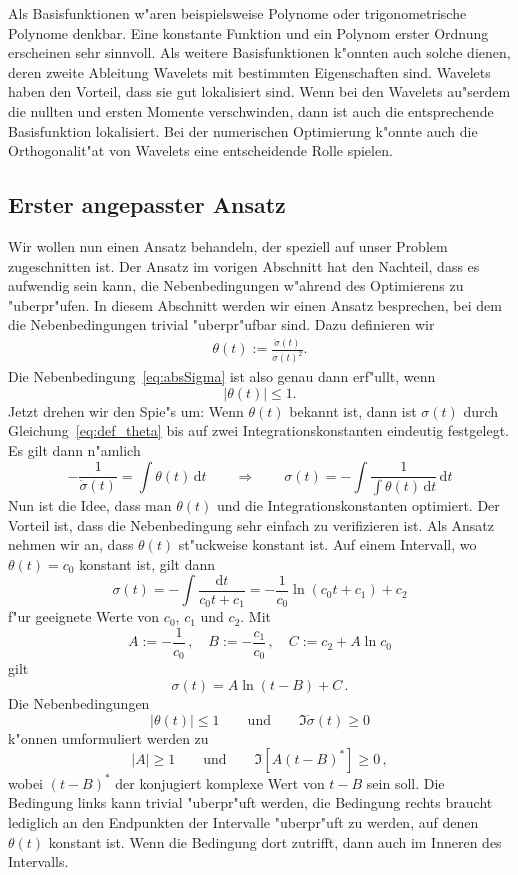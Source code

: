 \documentclass[a4paper]{scrartcl}
\newcommand{\de}{{\mathrm{d}}}
\begin{document}
Als Basisfunktionen w"aren beispielsweise Polynome oder trigonometrische Polynome denkbar. 
Eine konstante Funktion und ein Polynom erster Ordnung erscheinen sehr sinnvoll. 
Als weitere Basisfunktionen k"onnten auch solche dienen, deren zweite Ableitung Wavelets mit bestimmten Eigenschaften sind. 
Wavelets haben den Vorteil, dass sie gut lokalisiert sind. 
Wenn bei den Wavelets au"serdem die nullten und ersten Momente verschwinden, dann ist auch die entsprechende Basisfunktion lokalisiert. 
Bei der numerischen Optimierung k"onnte auch die Orthogonalit"at von Wavelets eine entscheidende Rolle spielen. 


\subsection{Erster angepasster Ansatz}

Wir wollen nun einen Ansatz behandeln, der speziell auf unser Problem zugeschnitten ist. 
Der Ansatz im vorigen Abschnitt hat den Nachteil, dass es aufwendig sein kann, die Nebenbedingungen w"ahrend des Optimierens zu "uberpr"ufen. 
In diesem Abschnitt werden wir einen Ansatz besprechen, bei dem die Nebenbedingungen trivial "uberpr"ufbar sind. 
Dazu definieren wir
\begin{align} \label{eq:def_theta} 
\theta(t) := \frac{\ddot\sigma(t)}{\dot\sigma(t)^2}. 
\end{align}
Die Nebenbedingung~\eqref{eq:absSigma} ist also genau dann erf"ullt, wenn 
$$ |\theta(t)| \le 1. $$
Jetzt drehen wir den Spie"s um: Wenn $\theta(t)$ bekannt ist, dann ist $\sigma(t)$ durch Gleichung~\eqref{eq:def_theta} bis auf zwei Integrationskonstanten eindeutig festgelegt. 
Es gilt dann n"amlich 
$$ -\frac{1}{\dot\sigma(t)} = \int\theta(t)\,\de t 
\qquad \Longrightarrow \qquad 
\sigma(t) = -\int \frac{1}{\int\theta(t)\,\de t}\,\de t $$
Nun ist die Idee, dass man $\theta(t)$ und die Integrationskonstanten optimiert. 
Der Vorteil ist, dass die Nebenbedingung sehr einfach zu verifizieren ist. 
Als Ansatz nehmen wir an, dass $\theta(t)$ st"uckweise konstant ist. 
Auf einem Intervall, wo $\theta(t)=c_0$ konstant ist, gilt dann 
$$ \sigma(t) = -\int \frac{\de t}{c_0t + c_1}
=-\frac{1}{c_0}\ln(c_0t+c_1) + c_2 $$
f"ur geeignete Werte von $c_0$, $c_1$ und $c_2$. Mit 
$$ A := -\frac{1}{c_0}\,, \quad
B:= -\frac{c_1}{c_0}\,, \quad
C:= c_2 + A\ln c_0 $$
gilt 
$$ \sigma(t) = A\ln(t-B) + C\,. $$
Die Nebenbedingungen 
$$ |\theta(t)| \le 1 \qquad \text{und} \qquad
\Im\dot\sigma(t)\ge 0 $$
k"onnen umformuliert werden zu
$$ |A|\ge 1 \qquad \text{und}\qquad
\Im\left[A(t-B)^*\right]\ge 0\,, $$
wobei $(t-B)^*$ der konjugiert komplexe Wert von $t-B$ sein soll. 
Die Bedingung links kann trivial "uberpr"uft werden, die Bedingung rechts braucht lediglich an den Endpunkten der Intervalle "uberpr"uft zu werden, auf denen $\theta(t)$ konstant ist. 
Wenn die Bedingung dort zutrifft, dann auch im Inneren des Intervalls. 
\end{document}
